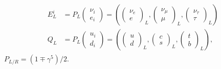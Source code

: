 \begin{eqnarray}
\begin{aligned} E_{L}^{i} &=P_{L}\left(\begin{array}{c}{\nu_{i}} \\ {e_{i}}\end{array}\right)=\left(\left(\begin{array}{c}{\nu_{e}} \\ {e}\end{array}\right)_{L},\left(\begin{array}{c}{\nu_{\mu}} \\ {\mu}\end{array}\right)_{L},\left(\begin{array}{c}{\nu_{\tau}} \\ {\tau}\end{array}\right)_{L}\right) \\ Q_{L} &=P_{L}\left(\begin{array}{c}{u_{i}} \\ {d_{i}}\end{array}\right)=\left(\left(\begin{array}{c}{u} \\ {d}\end{array}\right)_{L},\left(\begin{array}{c}{c} \\ {s}\end{array}\right)_{L},\left(\begin{array}{c}{t} \\ {b}\end{array}\right)_{L}\right), \end{aligned}
\end{eqnarray}
$P_{L / R}=\left(1 \mp \gamma^{5}\right) / 2$.\\
